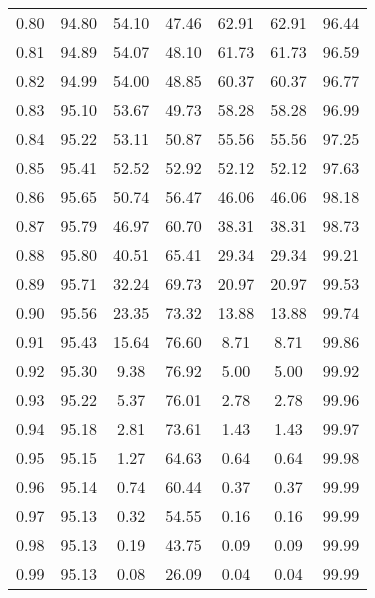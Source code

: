 \begin{tabular}{|c|c|c|c|c|c|c|}
      0.80 &     94.80 &     54.10 &      47.46 &   62.91 &      62.91 &         96.44 \\
      0.81 &     94.89 &     54.07 &      48.10 &   61.73 &      61.73 &         96.59 \\
      0.82 &     94.99 &     54.00 &      48.85 &   60.37 &      60.37 &         96.77 \\
      0.83 &     95.10 &     53.67 &      49.73 &   58.28 &      58.28 &         96.99 \\
      0.84 &     95.22 &     53.11 &      50.87 &   55.56 &      55.56 &         97.25 \\
      0.85 &     95.41 &     52.52 &      52.92 &   52.12 &      52.12 &         97.63 \\
      0.86 &     95.65 &     50.74 &      56.47 &   46.06 &      46.06 &         98.18 \\
      0.87 &     95.79 &     46.97 &      60.70 &   38.31 &      38.31 &         98.73 \\
      0.88 &     95.80 &     40.51 &      65.41 &   29.34 &      29.34 &         99.21 \\
      0.89 &     95.71 &     32.24 &      69.73 &   20.97 &      20.97 &         99.53 \\
      0.90 &     95.56 &     23.35 &      73.32 &   13.88 &      13.88 &         99.74 \\
      0.91 &     95.43 &     15.64 &      76.60 &    8.71 &       8.71 &         99.86 \\
      0.92 &     95.30 &      9.38 &      76.92 &    5.00 &       5.00 &         99.92 \\
      0.93 &     95.22 &      5.37 &      76.01 &    2.78 &       2.78 &         99.96 \\
      0.94 &     95.18 &      2.81 &      73.61 &    1.43 &       1.43 &         99.97 \\
      0.95 &     95.15 &      1.27 &      64.63 &    0.64 &       0.64 &         99.98 \\
      0.96 &     95.14 &      0.74 &      60.44 &    0.37 &       0.37 &         99.99 \\
      0.97 &     95.13 &      0.32 &      54.55 &    0.16 &       0.16 &         99.99 \\
      0.98 &     95.13 &      0.19 &      43.75 &    0.09 &       0.09 &         99.99 \\
      0.99 &     95.13 &      0.08 &      26.09 &    0.04 &       0.04 &         99.99 \\
\bottomrule
\end{tabular}
